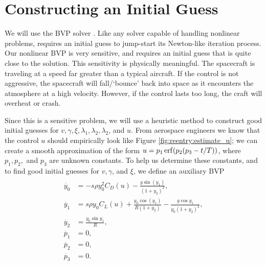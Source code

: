 \section*{Constructing an Initial Guess}
We will use the BVP solver .
Like any solver capable of handling nonlinear problems,  requires an initial guess to jump-start its Newton-like iteration process.
Our nonlinear BVP is very sensitive, and requires an initial guess that is quite close to the solution.
This sensitivity is physically meaningful.
The spacecraft is traveling at a speed far greater than a typical aircraft.
If the control is not aggressive, the spacecraft will fall/`bounce' back into space as it encounters the atmosphere at a high velocity.
However, if the control lasts too long, the craft will overheat or crash.

Since this is a sensitive problem, we will use a heuristic method to construct good initial guesses for $v, \gamma, \xi, \lambda_1, \lambda_2,\lambda_2$, and $u$.
From aerospace engineers we know that the control $u$ should empirically look like Figure \ref{fig:reentry:estimate_u};
we can create a smooth approximation of the form $u = p_1\operatorname{erf}(p_2(p_3-t/T))$, where $p_1, p_2,$ and $p_3$ are unknown constants.
To help us determine these constants, and to find good initial guesses for $v, \gamma$, and $\xi$, we define an auxiliary BVP
\begin{align}
\begin{split}
\dot{y_0} &= -s\rho y_0^2C_D(u) - \frac{g\sin(y_1)}{(1+y_2)^2},\\
\dot{y_1} &= s \rho y_0 C_L(u) + \frac{y_0 \cos(y_1)}{R(1+y_2)} - \frac{g \cos y_1}{y_0(1+y_2)^2},\\
\dot{y_2} &= \frac{y_0 \sin y_1}{R} ,\\
\dot{p_1} &= 0, \\
\dot{p_2} &= 0, \\
\dot{p_3} &= 0.
\end{split} \label{eqn:reentry:control_system_auxiliary}
\end{align}

